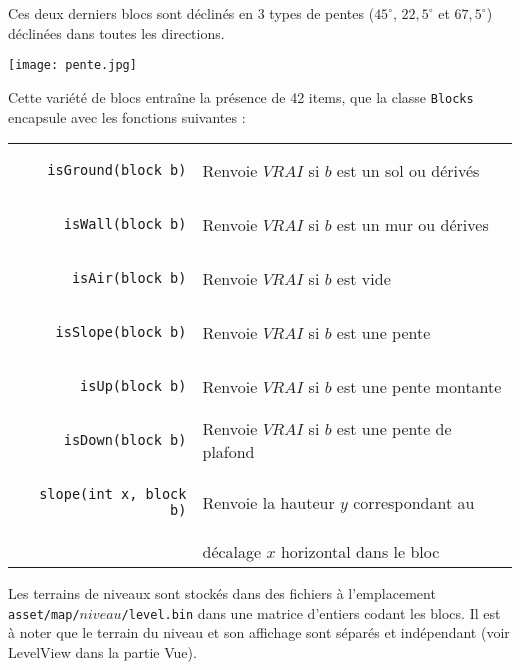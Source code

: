 \documentclass[a4paper,11pt]{article}
\begin{document}
Ces deux derniers blocs sont déclinés en 3 types de pentes ($45^\circ$, $22,5^\circ$ et $67,5^\circ$) déclinées dans toutes les directions.

\begin{center}
\texttt{[image: pente.jpg]}
\end{center}

Cette variété de blocs entraîne la présence de 42 items, que la classe \texttt{Blocks} encapsule avec les fonctions suivantes :
\vspace{0.3cm}

\renewcommand{\arraystretch}{1.3}
\begin{tabular}{r | l}
\begin{lstlisting}
isGround(block b)
\end{lstlisting}
& Renvoie $VRAI$ si $b$ est un sol ou dérivés \\
\begin{lstlisting}
isWall(block b)
\end{lstlisting}
& Renvoie $VRAI$ si $b$ est un mur ou dérives \\
\begin{lstlisting}
isAir(block b)
\end{lstlisting}
& Renvoie $VRAI$ si $b$ est vide \\
\begin{lstlisting}
isSlope(block b)
\end{lstlisting}
& Renvoie $VRAI$ si $b$ est une pente \\
\begin{lstlisting}
isUp(block b)
\end{lstlisting}
& Renvoie $VRAI$ si $b$ est une pente montante \\
\begin{lstlisting}
isDown(block b)
\end{lstlisting}
& Renvoie $VRAI$ si $b$ est une pente de plafond \\
\begin{lstlisting}
slope(int x, block b)
\end{lstlisting}
& Renvoie la hauteur $y$ correspondant au \\
& décalage $x$ horizontal dans le bloc

\end{tabular}

\vspace{0.4cm}
Les terrains de niveaux sont stockés dans des fichiers à l'emplacement \texttt{asset/map/$niveau$/level.bin} dans une matrice d'entiers codant les blocs. Il est à noter que le terrain du niveau et son affichage sont séparés et indépendant (voir LevelView dans la partie Vue).
\end{document}

